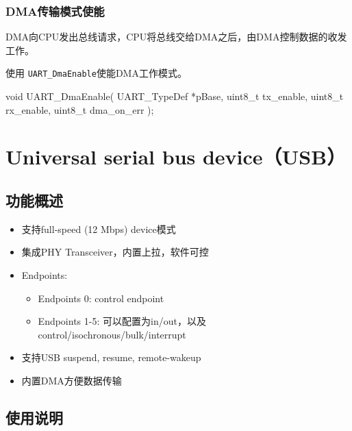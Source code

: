 \documentclass[
  12pt,
]{book}
\newenvironment{Shaded}{\begin{snugshade}}{\end{snugshade}}
\newcommand{\DataTypeTok}[1]{\textcolor[rgb]{0.13,0.29,0.53}{#1}}
\newcommand{\NormalTok}[1]{#1}
\providecommand{\tightlist}{%
  \setlength{\itemsep}{0pt}\setlength{\parskip}{0pt}}
\begin{document}
\hypertarget{dmaux4f20ux8f93ux6a21ux5f0fux4f7fux80fd}{%
\subsection{DMA传输模式使能}\label{dmaux4f20ux8f93ux6a21ux5f0fux4f7fux80fd}}

DMA向CPU发出总线请求，CPU将总线交给DMA之后，由DMA控制数据的收发工作。

使用 \texttt{UART\_DmaEnable}使能DMA工作模式。

\begin{Shaded}
\begin{Highlighting}[]
\DataTypeTok{void}\NormalTok{ UART_DmaEnable(}
\NormalTok{  UART_TypeDef *pBase, }
  \DataTypeTok{uint8_t}\NormalTok{ tx_enable, }
  \DataTypeTok{uint8_t}\NormalTok{ rx_enable, }
  \DataTypeTok{uint8_t}\NormalTok{ dma_on_err}
\NormalTok{  );}
\end{Highlighting}
\end{Shaded}

\hypertarget{universal-serial-bus-deviceusb}{%
\chapter{Universal serial bus device（USB）}\label{universal-serial-bus-deviceusb}}

\hypertarget{ux529fux80fdux6982ux8ff0-8}{%
\section{功能概述}\label{ux529fux80fdux6982ux8ff0-8}}

\begin{itemize}
\tightlist
\item
  支持full-speed (12 Mbps) device模式
\item
  集成PHY Transceiver，内置上拉，软件可控
\item
  Endpoints:

  \begin{itemize}
  \tightlist
  \item
    Endpoints 0: control endpoint
  \item
    Endpoints 1-5: 可以配置为in/out，以及control/isochronous/bulk/interrupt
  \end{itemize}
\item
  支持USB suspend, resume, remote-wakeup
\item
  内置DMA方便数据传输
\end{itemize}

\hypertarget{ux4f7fux7528ux8bf4ux660e-9}{%
\section{使用说明}\label{ux4f7fux7528ux8bf4ux660e-9}}
\end{document}
